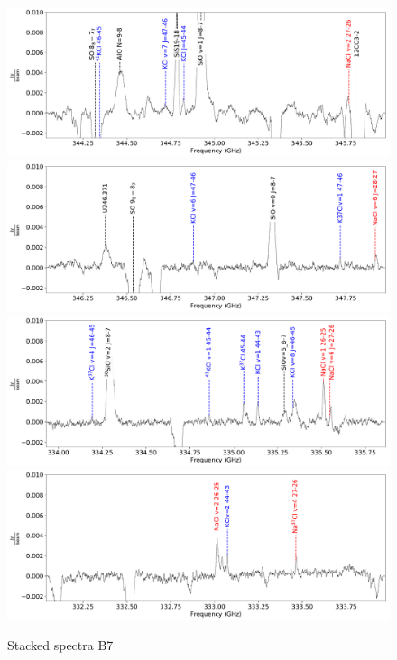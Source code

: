 \documentclass[twocolumn]{aastex62}
\begin{document}
\begin{figure}[!htp]
\includegraphics[scale=1,width=5.5in]{figures/color_labels_OrionSourceI_B7.lb_spw0_robust0.5.pdf}
\includegraphics[scale=1,width=5.5in]{figures/color_labels_OrionSourceI_B7.lb_spw1_robust0.5.pdf}
\includegraphics[scale=1,width=5.5in]{figures/color_labels_OrionSourceI_B7.lb_spw2_robust0.5.pdf}
\includegraphics[scale=1,width=5.5in]{figures/color_labels_OrionSourceI_B7.lb_spw3_robust0.5.pdf}
\caption{Stacked spectra B7}
\label{fig:spectrab7}
\end{figure}
\end{document}
